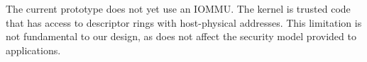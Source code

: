 The \ix current prototype does not yet use an IOMMU. The \ix kernel is trusted
code that has access to descriptor rings with host-physical addresses.
This limitation is not fundamental to our design, as does not affect the
security model provided to applications.



